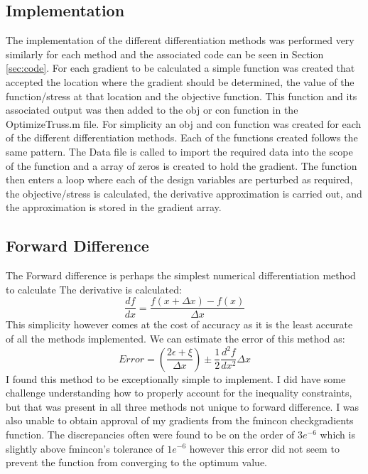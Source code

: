\documentclass{article}
\begin{document}
\subsection{Implementation}
The implementation of the different differentiation methods was performed very similarly for each method and the associated code can be seen in Section \ref{sec:code}. For each gradient to be calculated a simple function was created that accepted the location where the gradient should be determined, the value of the function/stress at that location and the objective function.  This function and its associated output was then added to the obj or con function in the OptimizeTruss.m file.  For simplicity an obj and con function was created for each of the different differentiation methods.  Each of the functions created follows the same pattern. The Data file is called to import the required data into the scope of the function and a array of zeros is created to hold the gradient.  The function then enters a loop where each of the design variables are perturbed as required, the objective/stress is calculated, the derivative approximation is carried out, and the approximation is stored in the gradient array.
\subsection{Forward Difference}
The Forward difference is perhaps the simplest numerical differentiation method to calculate The derivative is calculated:
\begin{equation}
\frac{df}{dx} = \frac{f\left(x + \Delta x\right) - f(x)}{\Delta x}
\end{equation}
This simplicity however comes at the cost of accuracy as it is the least accurate of all the methods implemented. We can estimate the error of this method as:
\begin{equation}
Error = \left(\frac{2\epsilon + \xi}{\Delta x}\right) \pm \frac{1}{2} \frac{d^2 f}{dx^2}\Delta x
\end{equation}
I found this method to be exceptionally simple to implement.  I did have some challenge understanding how to properly account for the inequality constraints, but that was present in all three methods not unique to forward difference.  I was also unable to obtain approval of my gradients from the fmincon checkgradients function.  The discrepancies often were found to be on the order of $3e^{-6}$ which is slightly above fmincon's tolerance of $1e^{-6}$ however this error did not seem to prevent the function from converging to the optimum value.
\end{document}
